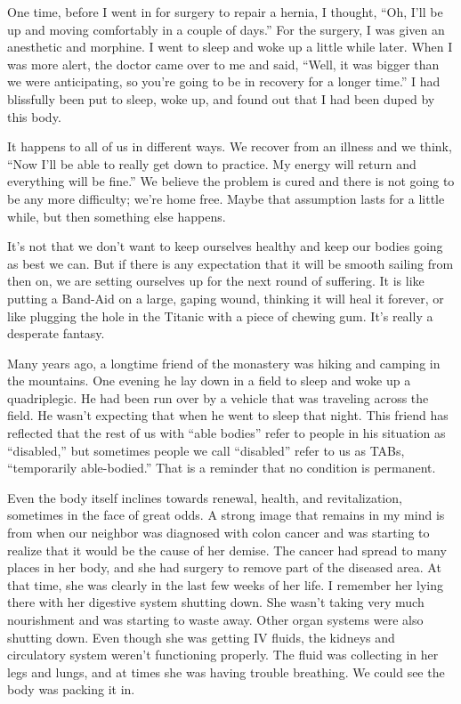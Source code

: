 One time, before I went in for surgery to repair a hernia, I thought, ``Oh, I'll be up and moving comfortably in a couple of days.'' For the surgery, I was given an anesthetic and morphine. I went to sleep and woke up a little while later. When I was more alert, the doctor came over to me and said, ``Well, it was bigger than we were anticipating, so you're going to be in recovery for a longer time.'' I had blissfully been put to sleep, woke up, and found out that I had been duped by this body.

It happens to all of us in different ways. We recover from an illness and we think, ``Now I'll be able to really get down to practice. My energy will return and everything will be fine.'' We believe the problem is cured and there is not going to be any more difficulty; we're home free. Maybe that assumption lasts for a little while, but then something else happens.

\enlargethispage{1\baselineskip}
It's not that we don't want to keep ourselves healthy and keep our bodies going as best we can. But if there is any expectation that it will be smooth sailing from then on, we are setting ourselves up for the next round of suffering. It is like putting a Band-Aid on a large, gaping wound, thinking it will heal it forever, or like plugging the hole in the Titanic with a piece of chewing gum. It's really a desperate fantasy.

Many years ago, a longtime friend of the monastery was hiking and camping in the mountains. One evening he lay down in a field to sleep and woke up a quadriplegic. He had been run over by a vehicle that was traveling across the field. He wasn't expecting that when he went to sleep that night. This friend has reflected that the rest of us with ``able bodies'' refer to people in his situation as ``disabled,'' but sometimes people we call ``disabled'' refer to us as TABs, ``temporarily able-bodied.'' That is a reminder that no condition is permanent.

Even the body itself inclines towards renewal, health, and revitalization, sometimes in the face of great odds. A strong image that remains in my mind is from when our neighbor was diagnosed with colon cancer and was starting to realize that it would be the cause of her demise. The cancer had spread to many places in her body, and she had surgery to remove part of the diseased area. At that time, she was clearly in the last few weeks of her life. I remember her lying there with her digestive system shutting down. She wasn't taking very much nourishment and was starting to waste away. Other organ systems were also shutting down. Even though she was getting IV fluids, the kidneys and circulatory system weren't functioning properly. The fluid was collecting in her legs and lungs, and at times she was having trouble breathing. We could see the body was packing it in.

